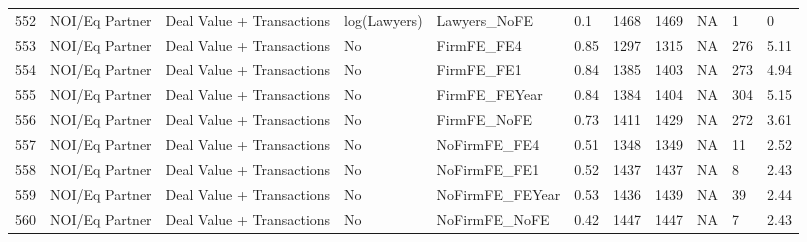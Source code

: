 \begin{table}[ht]
\begin{tabular}{rllllllllll}
  552 & NOI/Eq Partner & Deal Value + Transactions & log(Lawyers) & Lawyers\_NoFE & 0.1 & 1468 & 1469 & NA & 1 & 0 \\ 
  553 & NOI/Eq Partner & Deal Value + Transactions & No & FirmFE\_FE4 & 0.85 & 1297 & 1315 & NA & 276 & 5.11 \\ 
  554 & NOI/Eq Partner & Deal Value + Transactions & No & FirmFE\_FE1 & 0.84 & 1385 & 1403 & NA & 273 & 4.94 \\ 
  555 & NOI/Eq Partner & Deal Value + Transactions & No & FirmFE\_FEYear & 0.84 & 1384 & 1404 & NA & 304 & 5.15 \\ 
  556 & NOI/Eq Partner & Deal Value + Transactions & No & FirmFE\_NoFE & 0.73 & 1411 & 1429 & NA & 272 & 3.61 \\ 
  557 & NOI/Eq Partner & Deal Value + Transactions & No & NoFirmFE\_FE4 & 0.51 & 1348 & 1349 & NA & 11 & 2.52 \\ 
  558 & NOI/Eq Partner & Deal Value + Transactions & No & NoFirmFE\_FE1 & 0.52 & 1437 & 1437 & NA & 8 & 2.43 \\ 
  559 & NOI/Eq Partner & Deal Value + Transactions & No & NoFirmFE\_FEYear & 0.53 & 1436 & 1439 & NA & 39 & 2.44 \\ 
  560 & NOI/Eq Partner & Deal Value + Transactions & No & NoFirmFE\_NoFE & 0.42 & 1447 & 1447 & NA & 7 & 2.43 \\ 
   \hline
\end{tabular}
\end{table}
